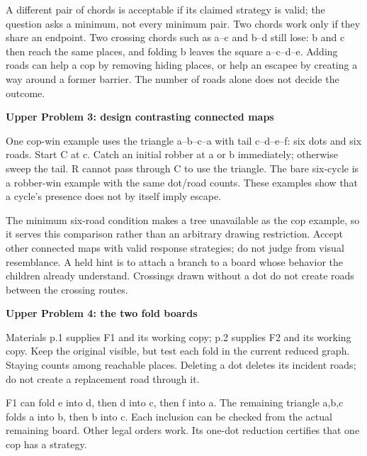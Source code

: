 \documentclass[11pt,letterpaper]{article}
\newcommand{\sub}[1]{\par\textbf{#1}\par}
\begin{document}
A different pair of chords is acceptable if its claimed strategy is valid; the question asks a minimum, not every minimum pair. Two chords work only if they share an endpoint. Two crossing chords such as a--c and b--d still lose: b and c then reach the same places, and folding b leaves the square a--c--d--e. Adding roads can help a cop by removing hiding places, or help an escapee by creating a way around a former barrier. The number of roads alone does not decide the outcome.

\sub{Upper Problem 3: design contrasting connected maps}
One cop-win example uses the triangle a--b--c--a with tail c--d--e--f: six dots and six roads. Start C at c. Catch an initial robber at a or b immediately; otherwise sweep the tail. R cannot pass through C to use the triangle. The bare six-cycle is a robber-win example with the same dot/road counts. These examples show that a cycle's presence does not by itself imply escape.

The minimum six-road condition makes a tree unavailable as the cop example, so it serves this comparison rather than an arbitrary drawing restriction. Accept other connected maps with valid response strategies; do not judge from visual resemblance. A held hint is to attach a branch to a board whose behavior the children already understand. Crossings drawn without a dot do not create roads between the crossing routes.

\sub{Upper Problem 4: the two fold boards}
Materials p.1 supplies F1 and its working copy; p.2 supplies F2 and its working copy. Keep the original visible, but test each fold in the current reduced graph. Staying counts among reachable places. Deleting a dot deletes its incident roads; do not create a replacement road through it.

F1 can fold e into d, then d into c, then f into a. The remaining triangle a,b,c folds a into b, then b into c. Each inclusion can be checked from the actual remaining board. Other legal orders work. Its one-dot reduction certifies that one cop has a strategy.
\end{document}
